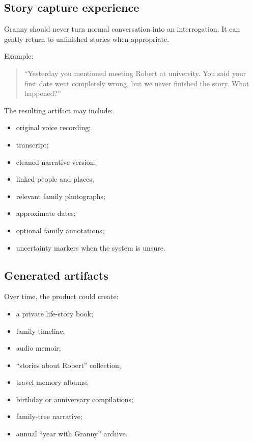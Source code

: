 \documentclass[11pt]{article}
\begin{document}
\subsection{Story capture experience}
Granny should never turn normal conversation into an interrogation. It can gently return to unfinished stories when appropriate.

Example:

\begin{quote}
``Yesterday you mentioned meeting Robert at university. You said your first date went completely wrong, but we never finished the story. What happened?''
\end{quote}

The resulting artifact may include:

\begin{itemize}[leftmargin=*]
    \item original voice recording;
    \item transcript;
    \item cleaned narrative version;
    \item linked people and places;
    \item relevant family photographs;
    \item approximate dates;
    \item optional family annotations;
    \item uncertainty markers when the system is unsure.
\end{itemize}

\subsection{Generated artifacts}
Over time, the product could create:

\begin{itemize}[leftmargin=*]
    \item a private life-story book;
    \item family timeline;
    \item audio memoir;
    \item ``stories about Robert'' collection;
    \item travel memory albums;
    \item birthday or anniversary compilations;
    \item family-tree narrative;
    \item annual ``year with Granny'' archive.
\end{itemize}
\end{document}
